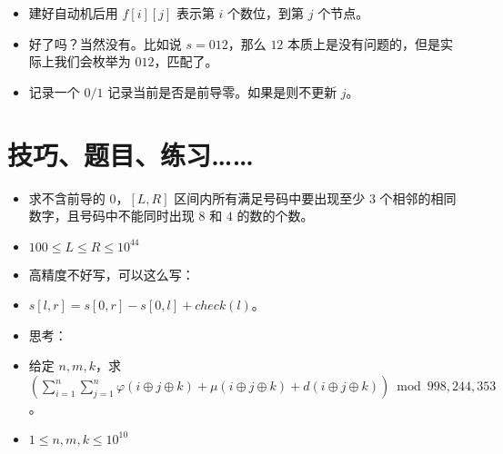 \documentclass[serif]{beamer}
\begin{document}
\begin{frame}
  \begin{itemize}[<+-| alert@+>]
    \item 建好自动机后用 $f[i][j]$ 表示第 $i$ 个数位，到第 $j$ 个节点。
    \item 好了吗？当然没有。比如说 $s={012}$，那么 $12$ 本质上是没有问题的，但是实际上我们会枚举为 $012$，匹配了。
    \item 记录一个 $0/1$ 记录当前是否是前导零。如果是则不更新 $j$。
  \end{itemize}
\end{frame}

\section{技巧、题目、练习……}
\begin{frame}
  \begin{itemize}
    \item 求不含前导的 $0$，$[L,R]$ 区间内所有满足号码中要出现至少 $3$ 个相邻的相同数字，且号码中不能同时出现 $8$ 和 $4$ 的数的个数。
    \item $100\le L\le R\le 10^{44}$
  \end{itemize}
\end{frame}

\begin{frame}
  \begin{itemize}[<+-| alert@+>]
    \item 高精度不好写，可以这么写：
    \item $s[l,r]=s[0,r]-s[0,l]+check(l)$。
  \end{itemize}
\end{frame}

\begin{frame}
  \begin{itemize}
    \item 思考：
    \item 给定 $n,m,k$，求 $(\sum_{i=1}^n\sum_{j=1}^n\varphi(i\oplus j\oplus k)+\mu(i\oplus j\oplus k)+d(i\oplus j\oplus k))\bmod 998,244,353$。
    \item $1\le n,m,k\le 10^{10}$
  \end{itemize}
\end{frame}
\end{document}
